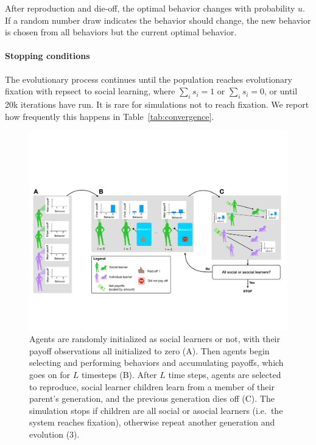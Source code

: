 \documentclass[letterpaper,11.5pt]{scrartcl}
\begin{document}
After reproduction and die-off, the optimal behavior changes with probability
$u$. If a random number draw indicates the behavior should change, the new
behavior is chosen from all behaviors but the current optimal behavior.

\paragraph{Stopping conditions} The evolutionary process continues until the
population reaches evolutionary fixation with repsect to social learning, where
$\sum_i s_i = 1$ or $\sum_i s_i = 0$, or until 20k iterations have run. 
It is rare for simulations not to reach fixation. We report how frequently
this happens in Table~\ref{tab:convergence}.

\begin{figure}
  \caption{Agents are randomly initialized as social learners or not, with their
  payoff observations all initialized to zero (A). Then agents begin selecting
and performing behaviors and accumulating payoffs, which goes on for $L$
timesteps (B). After $L$ time steps, agents are selected to reproduce,
social learner children learn from a member of their parent's generation, and
the previous generation dies off (C). The simulation stops if children are all
social or asocial learners (i.e.\ the system reaches fixation), 
otherwise repeat another generation and evolution (3).}
  \label{fig:schematic}
  \centering
    \includegraphics[width=\textwidth]{Figures/IntraInterGenerationalDynamics.pdf}
\end{figure}
\end{document}
